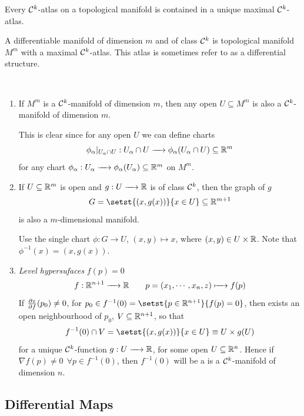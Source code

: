 \begin{lemma}
	Every $\calC^k$-atlas on a topological manifold is contained in a unique maximal $\calC^k$-atlas.
\end{lemma}

\begin{definition}
	A differentiable manifold of dimension $m$ and of class $\calC^k$ is topological manifold $M^m$ with a maximal $\calC^k$-atlas. This atlas is sometimes refer to as a differential structure.
\end{definition}

\begin{example}
	~
	\begin{enumerate}[(1)]
		\item
		If $M^m$ is a $\calC^k$-manifold of dimension $m$, then any open $U\subseteq M^m$ is also a $\calC^k$-manifold of dimension $m$.

		This is clear since for any open $U$ we can define charts
		$$\phi_\alpha\rvert_{U_\alpha\cap U} : U_\alpha\cap U \to \phi_\alpha(U_\alpha\cap U) \subseteq \bbR^m$$
		for any chart $\phi_\alpha : U_\alpha \to \phi_\alpha(U_\alpha) \subseteq \bbR^m$ on $M^m$.

		\item 
		If $U\subseteq \bbR^m$ is open and $g:U \to \bbR$ is of class $\calC^k$, then the graph of $g$
		$$ G = \setst{ (x,g(x)) }{ x \in U} \subseteq \bbR^{m+1} $$
		is also a $m$-dimensional manifold.
		
		Use the single chart $\phi : G \to U$, $(x, y) \mapsto x$, where $(x,y)\in U\times\bbR$. Note that $\phi^{-1}(x)=(x,g(x))$.

		\item \emph{Level hypersufaces} $f(p)=0$
		$$f:\bbR^{n+1}\to\bbR \qquad p=(x_1,\cdots,x_n,z)\mapsto f(p)$$
		If $\fracpd[z]{f}(p_0)\ne0$, for $p_0 \in f^{-1}(0) = \setst{p\in\bbR^{n+1}}{f(p)=0}$, then exists an open neighbourhood of $p_0$, $V\subseteq \bbR^{n+1}$, so that
		$$ f^{-1}(0) \cap V  = \setst{(x,g(x))}{ x \in U} \equiv U\times g(U) $$
		for a unique $\calC^k$-function $g:U\to\bbR$, for some open $U\subseteq\bbR^{n}$.
		Hence if $\nabla f (p)\ne 0 ~~\forall p \in f^{-1}(0)$, then $f^{-1}(0)$ will be a is a $\calC^k$-manifold of dimension $n$.
		
	\end{enumerate}
\end{example}

\subsection{Differential Maps}

